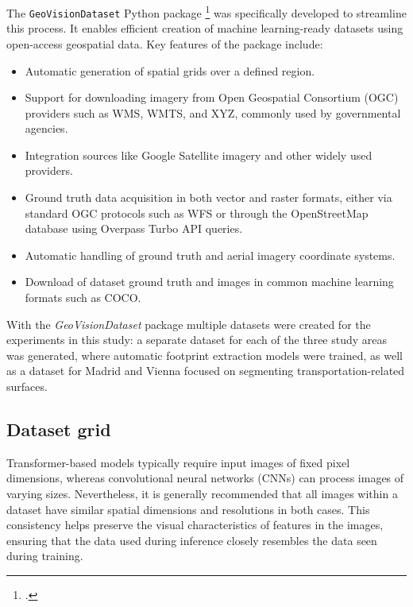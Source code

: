 \begin{refsection}
The \texttt{GeoVisionDataset} Python package \footcite{urena_pliego_transport-related_2025} was specifically developed to streamline this process. It enables efficient creation of machine learning-ready datasets using open-access geospatial data. Key features of the package include:

\begin{itemize}
    \item Automatic generation of spatial grids over a defined region.
    \item Support for downloading imagery from Open Geospatial Consortium (OGC) providers such as WMS, WMTS, and XYZ, commonly used by governmental agencies.
    \item Integration sources like Google Satellite imagery and other widely used providers.
    \item Ground truth data acquisition in both vector and raster formats, either via standard OGC protocols such as WFS or through the OpenStreetMap database using Overpass Turbo API queries.
    \item Automatic handling of ground truth and aerial imagery coordinate systems.
    \item Download of dataset ground truth and images in common machine learning formats such as COCO. 
\end{itemize}

With the \textit{GeoVisionDataset} package multiple datasets were created for the experiments in this study: a separate dataset for each of the three study areas was generated, where automatic footprint extraction models were trained, as well as a dataset for Madrid and Vienna focused on segmenting transportation-related surfaces.



\subsection{Dataset grid}

Transformer-based models typically require input images of fixed pixel dimensions, whereas convolutional neural networks (CNNs) can process images of varying sizes. Nevertheless, it is generally recommended that all images within a dataset have similar spatial dimensions and resolutions in both cases. This consistency helps preserve the visual characteristics of features in the images, ensuring that the data used during inference closely resembles the data seen during training.


\end{refsection}
